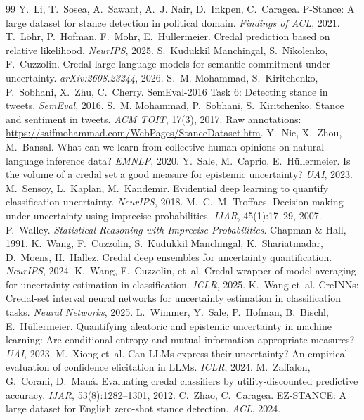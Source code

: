 \documentclass[11pt,a4paper]{article}
\begin{document}
\begin{thebibliography}{99}
 Y.~Li, T.~Sosea, A.~Sawant, A.~J. Nair, D.~Inkpen, C.~Caragea. P-Stance: A large dataset for stance detection in political domain. \emph{Findings of ACL}, 2021.
 T.~L\"ohr, P.~Hofman, F.~Mohr, E.~H\"ullermeier. Credal prediction based on relative likelihood. \emph{NeurIPS}, 2025.
 S.~Kudukkil Manchingal, S.~Nikolenko, F.~Cuzzolin. Credal large language models for semantic commitment under uncertainty. \emph{arXiv:2608.23244}, 2026.
 S.~M. Mohammad, S.~Kiritchenko, P.~Sobhani, X.~Zhu, C.~Cherry. SemEval-2016 Task 6: Detecting stance in tweets. \emph{SemEval}, 2016.
 S.~M. Mohammad, P.~Sobhani, S.~Kiritchenko. Stance and sentiment in tweets. \emph{ACM TOIT}, 17(3), 2017. Raw annotations: \url{https://saifmohammad.com/WebPages/StanceDataset.htm}.
 Y.~Nie, X.~Zhou, M.~Bansal. What can we learn from collective human opinions on natural language inference data? \emph{EMNLP}, 2020.
 Y.~Sale, M.~Caprio, E.~H\"ullermeier. Is the volume of a credal set a good measure for epistemic uncertainty? \emph{UAI}, 2023.
 M.~Sensoy, L.~Kaplan, M.~Kandemir. Evidential deep learning to quantify classification uncertainty. \emph{NeurIPS}, 2018.
 M.~C.~M. Troffaes. Decision making under uncertainty using imprecise probabilities. \emph{IJAR}, 45(1):17--29, 2007.
 P.~Walley. \emph{Statistical Reasoning with Imprecise Probabilities}. Chapman \& Hall, 1991.
 K.~Wang, F.~Cuzzolin, S.~Kudukkil Manchingal, K.~Shariatmadar, D.~Moens, H.~Hallez. Credal deep ensembles for uncertainty quantification. \emph{NeurIPS}, 2024.
 K.~Wang, F.~Cuzzolin, et~al. Credal wrapper of model averaging for uncertainty estimation in classification. \emph{ICLR}, 2025.
 K.~Wang et~al. CreINNs: Credal-set interval neural networks for uncertainty estimation in classification tasks. \emph{Neural Networks}, 2025.
 L.~Wimmer, Y.~Sale, P.~Hofman, B.~Bischl, E.~H\"ullermeier. Quantifying aleatoric and epistemic uncertainty in machine learning: Are conditional entropy and mutual information appropriate measures? \emph{UAI}, 2023.
 M.~Xiong et~al. Can LLMs express their uncertainty? An empirical evaluation of confidence elicitation in LLMs. \emph{ICLR}, 2024.
 M.~Zaffalon, G.~Corani, D.~Mau\'a. Evaluating credal classifiers by utility-discounted predictive accuracy. \emph{IJAR}, 53(8):1282--1301, 2012.
 C.~Zhao, C.~Caragea. EZ-STANCE: A large dataset for English zero-shot stance detection. \emph{ACL}, 2024.
\end{thebibliography}
\end{document}
